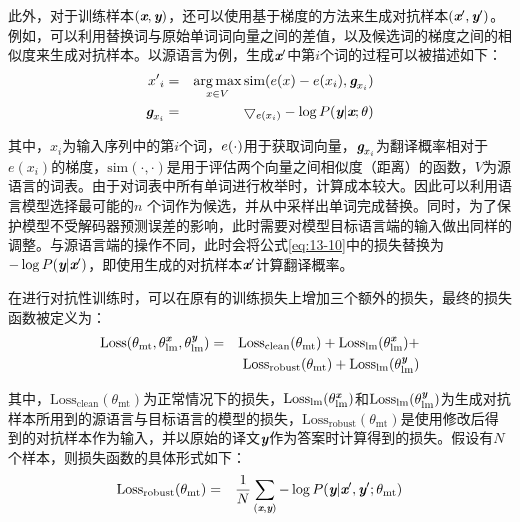 \parinterval 此外，对于训练样本$(\textbf{\em x},\textbf{\em y})$，还可以使用基于梯度的方法来生成对抗样本$(\textbf{\em x}',\textbf{\em y}')$。例如，可以利用替换词与原始单词词向量之间的差值，以及候选词的梯度之间的相似度来生成对抗样本。以源语言为例，生成$\textbf{\em x}'$中第$i$个词的过程可以被描述如下：
\begin{eqnarray}
{{x}'}_i &=& \operatorname*{arg\,max}_{{x}\in V}\textrm{sim}({e}({x})-{e}({x}_i),\textbf{\em g}_{{x}_i})
\label{eq:13-9} \\
\textbf{\em g}_{{x}_i} &=&  \bigtriangledown_{{e}({x}_i)} - \log {P}(\textbf{\em y}|\textbf{\em x};\theta)
\label{eq:13-10}
\end{eqnarray}

\noindent 其中，${x}_i$为输入序列中的第$i$个词，${e}(\cdot)$用于获取词向量，$\textbf{\em g}_{{x}_i}$为翻译概率相对于$e({x}_i)$的梯度，$\textrm{sim}(\cdot,\cdot)$是用于评估两个向量之间相似度（距离）的函数，$V$为源语言的词表。由于对词表中所有单词进行枚举时，计算成本较大。因此可以利用语言模型选择最可能的$n$ 个词作为候选，并从中采样出单词完成替换。同时，为了保护模型不受解码器预测误差的影响，此时需要对模型目标语言端的输入做出同样的调整。与源语言端的操作不同，此时会将公式\eqref{eq:13-10}中的损失替换为$- \log {P}(\textbf{\em y}|\textbf{\em x}')$，即使用生成的对抗样本$\textbf{\em x}'$计算翻译概率。

\parinterval 在进行对抗性训练时，可以在原有的训练损失上增加三个额外的损失，最终的损失函数被定义为：
\begin{eqnarray}
\textrm{Loss}(\theta_{\textrm{mt}},\theta_{\textrm{lm}}^{\textbf{\em x}},\theta_{\textrm{lm}}^{\textbf{\em y}}) &=& \textrm{Loss}_{\textrm{clean}}(\theta_{\textrm{mt}}) + \textrm{Loss}_{\textrm{lm}}(\theta_{\textrm{lm}}^{\textbf{\em x}}) + \nonumber \\
& & \textrm{Loss}_{\textrm{robust}}(\theta_{\textrm{mt}}) + \textrm{Loss}_{\textrm{lm}}(\theta_{\textrm{lm}}^{\textbf{\em y}})
\label{eq:13-11}
\end{eqnarray}

\noindent 其中，$\textrm{Loss}_{\textrm{clean}}(\theta_{\textrm{mt}})$为正常情况下的损失，$\textrm{Loss}_{\textrm{lm}}(\theta_{\textrm{lm}}^{\textbf{\em x}})$和$\textrm{Loss}_{\textrm{lm}}(\theta_{\textrm{lm}}^{\textbf{\em y}})$为生成对抗样本所用到的源语言与目标语言的模型的损失，$\textrm{Loss}_{\textrm{robust}}(\theta_{\textrm{mt}})$是使用修改后得到的对抗样本作为输入，并以原始的译文$\textbf{\em y}$作为答案时计算得到的损失。假设有$N$个样本，则损失函数的具体形式如下：
\begin{eqnarray}
\textrm{Loss}_{\textrm{robust}}(\theta_{\textrm{mt}}) &=&  \frac{1}{N}\sum_{(\textbf{\em x},\textbf{\em y})}-\log {P}(\textbf{\em y}|\textbf{\em x}',\textbf{\em y}';\theta_{\textrm{mt}})
\label{eq:13-12}
\end{eqnarray}

